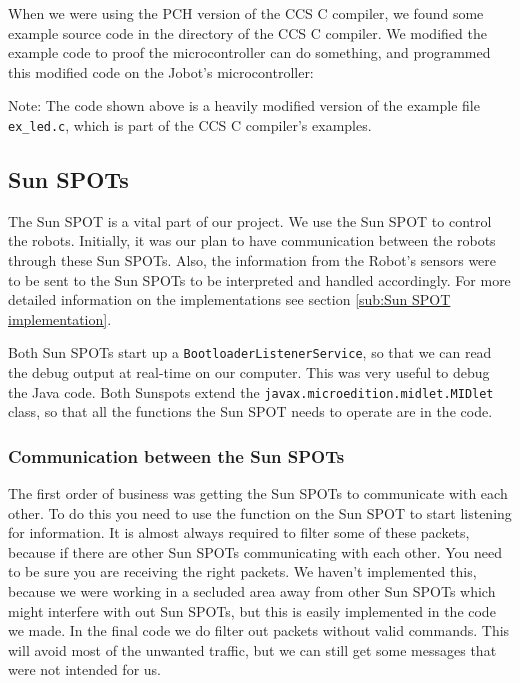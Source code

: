 \documentclass[a4paper,10pt]{article} %
\begin{document}
When we were using the PCH version of the CCS C compiler, we found some example
source code in the directory of the CCS C compiler. We modified the example code
to proof the microcontroller can do something, and programmed this modified code
on the Jobot's microcontroller:



\noindent Note: The code shown above is a heavily modified version of the
example file \texttt{ex\_led.c}, which is part of the CCS C compiler's examples.



\subsection{Sun SPOTs} %
\label{sec:sunspot}

The Sun SPOT is a vital part of our project. We use the Sun SPOT to control the
robots. Initially, it was our plan to have communication between the robots
through these Sun SPOTs. Also, the information from the Robot's sensors were to
be sent to the Sun SPOTs to be interpreted and handled accordingly. For more
detailed information on the implementations see section \ref{sub:Sun SPOT
implementation}.

Both Sun SPOTs start up a \texttt{BootloaderListenerService}, so that we can
read the debug output at real-time on our computer. This was very useful to
debug the Java code. Both Sunspots extend the
\texttt{javax.microedition.midlet.MIDlet} class, so that all the functions the
Sun SPOT needs to operate are in the code.

\subsubsection{Communication between the Sun SPOTs} %
\label{subsec:comm}

The first order of business was getting the Sun SPOTs to communicate with each
other. To do this you need to use the function on the Sun SPOT to start
listening for information. It is almost always required to filter some of these
packets, because if there are other Sun SPOTs communicating with each other.
You need to be sure you are receiving the right packets. We haven't implemented
this, because we were working in a secluded area away from other Sun SPOTs which
might interfere with out Sun SPOTs, but this is easily implemented in the code
we made. In the final code we do filter out packets without valid commands.
This will avoid most of the unwanted traffic, but we can still get some messages
that were not intended for us.
\end{document}
